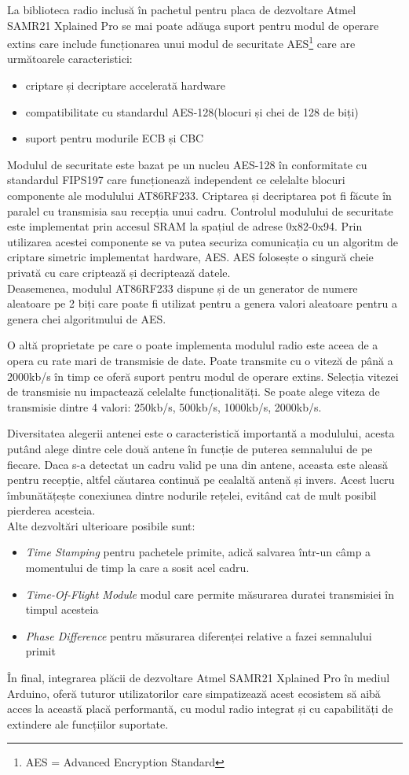 \documentclass[12pt,a4paper]{report}
\begin{document}
La biblioteca radio inclusă în pachetul pentru placa de dezvoltare Atmel SAMR21 Xplained Pro se mai poate adăuga suport pentru modul de operare extins care include funcționarea unui modul de securitate AES\footnote{AES = Advanced Encryption Standard} care are următoarele caracteristici:
\begin{itemize}
	\item criptare și decriptare accelerată hardware
	\item compatibilitate cu standardul AES-128(blocuri și chei de 128 de biți)
	\item suport pentru modurile ECB și CBC
\end{itemize}
Modulul de securitate este bazat pe un nucleu AES-128 în conformitate cu standardul FIPS197\cite{fips197} care funcționează independent ce celelalte blocuri componente ale modulului AT86RF233. Criptarea și decriptarea pot fi făcute în paralel cu transmisia sau recepția unui cadru. Controlul modulului de securitate este implementat prin accesul SRAM la spațiul de adrese 0x82-0x94.
Prin utilizarea acestei componente se va putea securiza comunicația cu un algoritm de criptare simetric implementat hardware, AES. AES folosește o singură cheie privată cu care criptează și decriptează datele.\\
Deasemenea, modulul AT86RF233 dispune și de un generator de numere aleatoare pe 2 biți care poate fi utilizat pentru a genera valori aleatoare pentru a genera chei algoritmului de AES.

O altă proprietate pe care o poate implementa modulul radio este aceea de a opera cu rate mari de transmisie de date. Poate transmite cu o viteză de până a 2000kb/s în timp ce oferă suport pentru modul de operare extins. Selecția vitezei de transmisie nu impactează celelalte funcționalități. Se poate alege viteza de transmisie dintre 4 valori: 250kb/s, 500kb/s, 1000kb/s, 2000kb/s.

Diversitatea alegerii antenei este o caracteristică importantă a modulului, acesta putând alege dintre cele două antene în funcție de puterea semnalului de pe fiecare. Daca s-a detectat un cadru valid pe una din antene, aceasta este aleasă pentru recepție, altfel căutarea continuă pe cealaltă antenă și invers. Acest lucru îmbunătățește conexiunea dintre nodurile rețelei, evitând cat de mult posibil pierderea acesteia.\\
Alte dezvoltări ulterioare posibile sunt:
\begin{itemize}
 	\item  \textit{Time Stamping} pentru pachetele primite, adică salvarea într-un câmp a momentului de timp la care a sosit acel cadru.
	\item \textit{Time-Of-Flight Module} modul care permite măsurarea duratei transmisiei în timpul acesteia
	\item \textit{Phase Difference} pentru măsurarea diferenței relative a fazei semnalului primit
\end{itemize}
În final, integrarea plăcii de dezvoltare Atmel SAMR21 Xplained Pro în mediul Arduino, oferă tuturor utilizatorilor care simpatizează acest ecosistem să aibă acces la această placă performantă, cu modul radio integrat și cu capabilități de extindere ale funcțiilor suportate.
\end{document}
